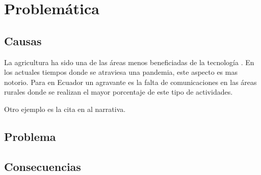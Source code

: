 \chapter{Problemática}
\section{Causas}

La agricultura ha sido una de las áreas menos beneficiadas de la tecnología \citep{espinoza2017tecnologias}. En los actuales tiempos donde se atraviesa una pandemia, este aspecto es mas notorio. Para \citet{sanchez2020arquitectura} en Ecuador un agravante es la falta de comunicaciones en las áreas rurales donde se realizan el mayor porcentaje de este tipo de actividades.
 





Otro ejemplo es la cita en al narrativa. 
\section{Problema}
\section{Consecuencias}
